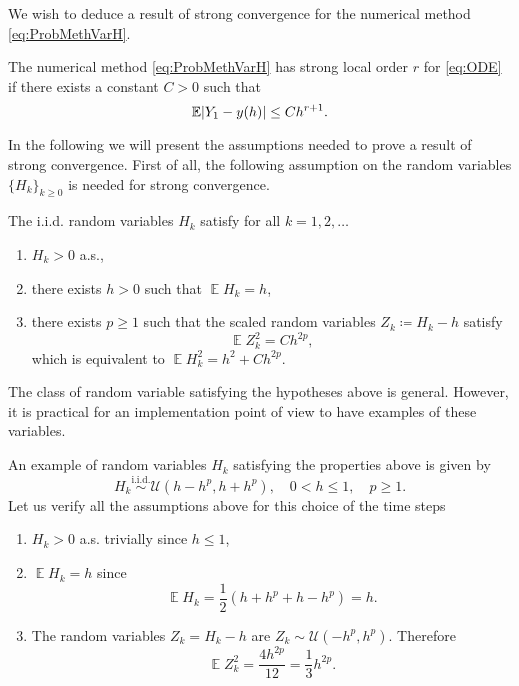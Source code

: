 \documentclass{siamart1116}
\numberwithin{theorem}{section}
\DeclarePairedDelimiter{\abs}{\lvert}{\rvert}
\newcommand{\iid}{\ensuremath{\stackrel{\text{i.i.d.}}{\sim}}}
\newcommand{\defeq}{\coloneqq}
\newcommand{\E}{\operatorname{\mathbb{E}}}
\begin{document}
We wish to deduce a result of strong convergence for the numerical method \eqref{eq:ProbMethVarH}. 
\begin{definition} The numerical method \eqref{eq:ProbMethVarH} has strong local order $r$ for \eqref{eq:ODE} if there exists a constant $C > 0$ such that
	\begin{equation}
	\E\abs{Y_1 - y(h)} \leq Ch^{r+1}.
	\end{equation}
\end{definition} 
In the following we will present the assumptions needed to prove a result of strong convergence. First of all, the following assumption on the random variables $\{H_k\}_{k\geq 0}$ is needed for strong convergence.
\begin{assumption}\label{as:hStrong} The i.i.d. random variables $H_k$ satisfy for all $k = 1, 2, \ldots$
	\begin{enumerate}
		\item $H_k > 0$ a.s.,
		\item there exists $h > 0$ such that $\E H_k = h$,
		\item there exists $p \geq 1$ such that the scaled random variables $Z_k \defeq H_k - h$ satisfy
		\begin{equation}
			\E Z_k^2 = Ch^{2p},
		\end{equation}
		which is equivalent to $\E H_k^2 = h^2 + Ch^{2p}$.
	\end{enumerate}
\end{assumption}
The class of random variable satisfying the hypotheses above is general. However, it is practical for an implementation point of view to have examples of these variables.
\begin{example}\label{ex:uniformH} An example of random variables $H_k$ satisfying the properties above is given by
	\begin{equation}
		H_k \iid \mathcal{U}(h-h^p, h+h^p), \quad 0 < h \leq 1, \quad p \geq 1.
	\end{equation}
	Let us verify all the assumptions above for this choice of the time steps
	\begin{enumerate}
		\item $H_k > 0$ a.s. trivially since $h \leq 1$,
		\item $\E H_k = h$ since 
		\begin{equation}
			\E H_k = \frac{1}{2}(h + h^p + h - h^p) = h.
		\end{equation}
		\item The random variables $Z_k = H_k - h$ are $Z_k \sim \mathcal{U}(-h^p, h^p)$. Therefore
		\begin{equation}
			\E Z_k^2 = \frac{4h^{2p}}{12} = \frac{1}{3}h^{2p}.
		\end{equation}
	\end{enumerate}
\end{example}
\end{document}
